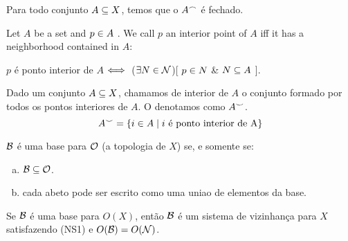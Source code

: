 \begin{theorem}
	Para todo conjunto $A \subseteq X$, temos que o $A^{\frown}$ é fechado.
\end{theorem}

\begin{definition}
	Let $A$ be a set and $p \in A$ . We call $p$ an interior point of $A$ iff it has a neighborhood contained in $A$:
	\begin{center}
		$p$ é ponto interior de $A$ $\Longleftrightarrow\;$ ($\exists N \in \mathcal{N}$)[ $p \in N$ \& $N \subseteq A$ ].
	\end{center}
\end{definition}

\begin{definition}
	Dado um conjunto $A \subseteq X$, chamamos de interior de $A$ o conjunto formado por todos os pontos interiores de $A$. O denotamos como $A^{\smile}$.
	\[
		A^{\smile} = \left\{ i \in A \mid \text{$i$ é ponto interior de A} \right\}
	\]
\end{definition}

\begin{definition}
	$\mathcal{B}$ é uma base para $\mathcal{O}$ (a topologia de $X$) se, e somente se:
	\begin{enumerate}[a)]
		\item $\mathcal{B} \subseteq \mathcal{O}$.
		\item cada abeto pode ser escrito como uma uniao de elementos da base.
	\end{enumerate}
\end{definition}

\begin{theorem}
	Se $\mathcal{B}$ é uma base para $O(X)$, então $\mathcal{B}$ é um sistema de vizinhança para $X$ satisfazendo (NS1) e $O(\mathcal{B}) = O(\mathcal{N})$.
\end{theorem}